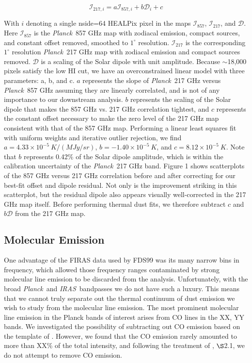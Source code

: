 \documentclass{emulateapj}
\newcommand{\IRAS}{{\it IRAS}}
\newcommand{\PLANCK}{{\it Planck}}
\begin{document}
\begin{equation}
\mathcal{I}_{217, i} = a\mathcal{I}_{857, i} + b\mathcal{D}_{i} + c
\end{equation}

With $i$ denoting a single nside=64 HEALPix pixel in the maps 
$\mathcal{I}_{857}$, $\mathcal{I}_{217}$, and $\mathcal{D}$. Here 
$\mathcal{I}_{857}$ is the \PLANCK~857 GHz map with zodiacal emission, compact 
sources, and constant offset removed, smoothed to $1^{\circ}$ resolution. 
$\mathcal{I}_{217}$ is the corresponding $1^{\circ}$ resolution \PLANCK~217 
GHz map with zodiacal emission and compact sources removed. $\mathcal{D}$ is a
scaling of the Solar dipole with unit amplitude. Because $\sim$18,000 pixels
satisfy the low HI cut, we have an overconstrained linear model with three
parameters: a, b, and c. $a$ represents the slope of \PLANCK~217 GHz 
versus \PLANCK~857 GHz assuming they are linearly correlated, and is not
of any importance to our downstream analysis. $b$ represents the scaling of 
the Solar dipole that makes the 857 GHz vs. 217 GHz correlation tightest, and 
$c$ represents the constant offset necessary to make the zero level of the 217 
GHz map consistent with that of the 857 GHz map. Performing a linear least
squares fit with uniform weights and iterative outlier rejection, we find 
$a=4.33\times10^{-5}\ K/(MJy/sr)$, $b=-1.40\times10^{-5}\ K$, and 
$c=8.12\times10^{-5}\ K$. Note that $b$ represents 0.42\% of the Solar dipole 
amplitude, which is within the calibration uncertainty of the \PLANCK~217 GHz 
band. Figure 1 shows scatterplots of the 857 GHz versus 217 GHz correlation 
before and after correcting for our best-fit offset and dipole residual. Not 
only is the improvement striking in this scatterplot, but the residual dipole 
also appears visually well-corrected in the 217 GHz map itself. Before 
performing thermal dust fits, we therefore subtract $c$ and $b\mathcal{D}$ from
the 217 GHz map.


\subsection{Molecular Emission}
One advantage of the FIRAS data used by FDS99 was its many narrow bins in 
frequency, which allowed those frequency ranges contaminated by strong 
molecular line emission to be discarded from the analysis. Unfortunately, with 
the broad \PLANCK~and \IRAS~bandpasses we do not have such a luxury. This means
 that we cannot truly separate out the thermal continuum of dust emission we 
wish to study from the molecular line emission. The most prominent molecular 
line emission in the Planck bands of interest arises from CO lines in the XX, 
YY bands. We investigated the possibility of subtracting out CO emission based 
on the template of \cite{planckco}. However, we found that the CO emission
rarely amounted to more than XX\% of the total intensity, and following
the treatment of \cite{planckdust}, $\S$2.1, we do not attempt to remove CO
emission.
\end{document}

